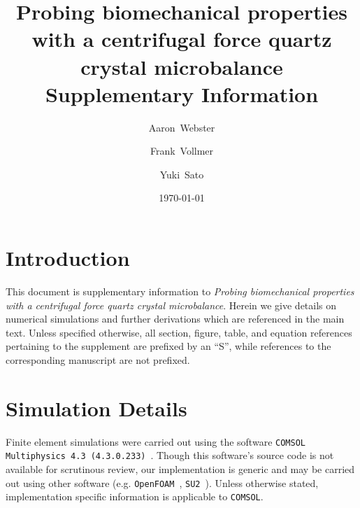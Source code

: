 \documentclass[floatfix,superscriptaddress,a4paper,notitlepage]{revtex4-1}
\newcommand{\comsol}{\texttt{COMSOL}}
\newcommand{\todo}[1]{%
 \textcolor{tangoorange}{#1}
}
\begin{document}
\title{Probing biomechanical properties with a centrifugal force quartz
 crystal microbalance\\ Supplementary Information}
\author{Aaron~Webster}
\author{Frank~Vollmer}
\author{Yuki~Sato}
\date{\today}


\maketitle

\tableofcontents

\section{Introduction}
This document is supplementary information to 
\textit{Probing biomechanical properties with a centrifugal force quartz
crystal microbalance}.  Herein we give details on numerical simulations and
further derivations which are referenced in the main text.  Unless
specified otherwise, all section, figure, table, and equation references
pertaining to the supplement are prefixed by an ``S'', while references to
the corresponding manuscript are not prefixed.

\section{Simulation Details}
Finite element simulations were carried out using the software
\texttt{COMSOL Multiphysics 4.3 (4.3.0.233)}~\cite{multiphysics1994comsol}.
Though this software's source code is not available for
scrutinous review, our implementation is generic and may be carried out
using other software (e.g. \texttt{OpenFOAM}~\cite{jasak2007openfoam},
\texttt{SU2}~\cite{palacios2013stanford}).  Unless otherwise stated,
implementation specific information is applicable to \comsol.
\end{document}
